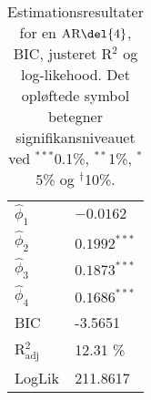 \begin{table}[h]
\center
\begin{tabular}{ll}
\toprule
$\widehat{\phi}_1$ &$ -0.0162 $ \\
$\widehat{\phi}_2$ & $0.1992^{***}$  \\
$\widehat{\phi}_3$ &$0.1873^{***}$  \\
$\widehat{\phi}_4$ &$0.1686^{***} $ \\ \midrule
BIC & -3.5651 \\
 R$^2_{\text{adj}}$ & 12.31 \% \\
LogLik &  211.8617\\ \bottomrule
 \end{tabular}
\caption{Estimationsresultater for en \(\text{AR} \del{4}\), BIC, justeret R$^2$ og log-likehood. Det opløftede symbol betegner signifikansniveauet ved $^{***}$0.1\%, $^{**}$1\%, $^{*}$5\% og $^{\dagger}$10\%.} \label{tab:est_ar}
\end{table}